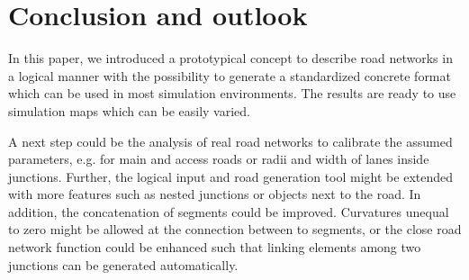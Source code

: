 \documentclass[a4paper, 10pt, conference]{ieeeconf}      %
\begin{document}
\section{Conclusion and outlook} %
In this paper, we introduced a prototypical concept to describe road networks in a logical manner with the possibility to generate a standardized concrete format which can be used in most simulation environments.
The results are ready to use simulation maps which can be easily varied.

A next step could be the analysis of real road networks to calibrate the assumed parameters, e.g. for main and access roads or radii and width of lanes inside junctions.
Further, the logical input and road generation tool might be extended with more features such as nested junctions or objects next to the road.
In addition, the concatenation of segments could be improved. Curvatures unequal to zero might be allowed at the connection between to segments, or the close road network function could be enhanced such that linking elements among two junctions can be generated automatically.












\end{document}
